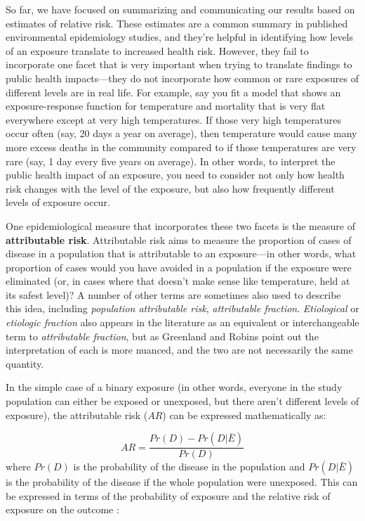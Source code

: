 \documentclass[
]{book}
\begin{document}
So far, we have focused on summarizing and communicating our results based on estimates of relative risk. These estimates are a common summary in published environmental epidemiology studies, and they're helpful in identifying how levels of an exposure translate to increased health risk. However, they fail to incorporate one facet that is very important when trying to translate findings to public health impacts---they do not incorporate how common or rare exposures of different levels are in real life. For example, say you fit a model that shows an exposure-response function for temperature and mortality that is very flat everywhere except at very high temperatures. If those very high temperatures occur often (say, 20 days a year on average), then temperature would cause many more excess deaths in the community compared to if those temperatures are very rare (say, 1 day every five years on average). In other words, to interpret the public health impact of an exposure, you need to consider not only how health risk changes with the level of the exposure, but also how frequently different levels of exposure occur.

One epidemiological measure that incorporates these two facets is the measure of \textbf{attributable risk}. Attributable risk aims to measure the proportion of cases of disease in a population that is attributable to an exposure---in other words, what proportion of cases would you have avoided in a population if the exposure were eliminated (or, in cases where that doesn't make sense like temperature, held at its safest level)? A number of other terms are sometimes also used to describe this idea, including \emph{population attributable risk}, \emph{attributable fraction}. \emph{Etiological} or \emph{etiologic fraction} also appears in the literature as an equivalent or interchangeable term to \emph{attributable fraction}, but as Greenland and Robins point out \citep{greenland1988conceptual} the interpretation of each is more nuanced, and the two are not necessarily the same quantity.

In the simple case of a binary exposure (in other words, everyone in the study population can either be exposed or unexposed, but there aren't different levels of exposure), the attributable risk (\(AR\)) can be expressed mathematically as:

\[
AR = \frac{Pr(D) - Pr(D|\bar{E})}{Pr(D)}
\]
where \(Pr(D)\) is the probability of the disease in the population and \(Pr(D|\bar{E})\) is the probability of the disease if the whole population were unexposed. This can be expressed in terms of the probability of exposure and the relative risk of exposure on the outcome \citep{benichou2006attributable, northridge1995public}:
\end{document}
